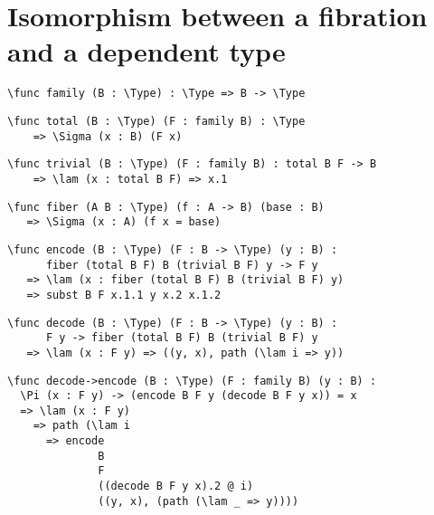 \section{Isomorphism between a fibration and a dependent type}

\begin{ListingEnv}[H]
\begin{lstlisting}
\func family (B : \Type) : \Type => B -> \Type
\end{lstlisting}
\end{ListingEnv}

\begin{ListingEnv}[H]
\begin{lstlisting}
\func total (B : \Type) (F : family B) : \Type 
	=> \Sigma (x : B) (F x)
\end{lstlisting}
\end{ListingEnv}

\begin{ListingEnv}[H]
\begin{lstlisting}
\func trivial (B : \Type) (F : family B) : total B F -> B 
	=> \lam (x : total B F) => x.1
\end{lstlisting}
\end{ListingEnv}

\begin{ListingEnv}[H]
\begin{lstlisting}
\func fiber (A B : \Type) (f : A -> B) (base : B)
   => \Sigma (x : A) (f x = base)
\end{lstlisting}
\end{ListingEnv}

\begin{ListingEnv}[H]
\begin{lstlisting}
\func encode (B : \Type) (F : B -> \Type) (y : B) :
      fiber (total B F) B (trivial B F) y -> F y
   => \lam (x : fiber (total B F) B (trivial B F) y)
   => subst B F x.1.1 y x.2 x.1.2
\end{lstlisting}
\end{ListingEnv}

\begin{ListingEnv}[H]
\begin{lstlisting}
\func decode (B : \Type) (F : B -> \Type) (y : B) :
      F y -> fiber (total B F) B (trivial B F) y
   => \lam (x : F y) => ((y, x), path (\lam i => y))
\end{lstlisting}
\end{ListingEnv}

\begin{ListingEnv}[H]
\begin{lstlisting}
\func decode->encode (B : \Type) (F : family B) (y : B) :
  \Pi (x : F y) -> (encode B F y (decode B F y x)) = x
  => \lam (x : F y)
    => path (\lam i
      => encode
              B
              F
              ((decode B F y x).2 @ i)
              ((y, x), (path (\lam _ => y))))
\end{lstlisting}
\end{ListingEnv}

